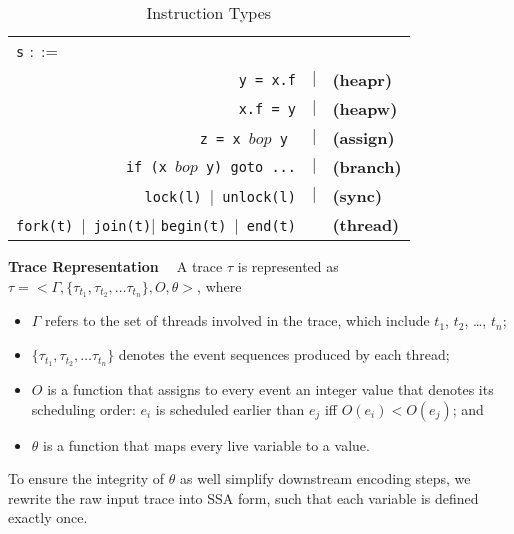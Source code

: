 \begin{table}
	\begin{center}
		\begin{tabular}{rcl}
			\multicolumn{1}{l}{{\tt s} $::=$} & & \\
			{\tt y = x.f} & $|$ & {\bf (heapr)} \\ 
			{\tt x.f = y}  & $|$ & {\bf (heapw)} \\ %
			{\tt z = x $bop$ y}\  & $|$ & {\bf (assign)} \\ %
			{\tt if (x $bop$  y) goto ...} & $|$ &  {\bf (branch)} \\
			{\tt lock(l)}\ $|$\ {\tt unlock(l)}  & $|$& {\bf (sync)} \\
			{\tt fork(t)}\ $|$\ {\tt join(t)}$|$ {\tt begin(t)}\ $|$\ {\tt end(t)} &  & {\bf (thread)}
		\end{tabular}
	\end{center}
	\caption{\label{Ta:syntax}Instruction Types}
\vspace{-0.15in}
\end{table}


{\bf Trace Representation \ } A trace $\tau$ is represented as $\tau=<\Gamma , \{\tau_{t_1}, \tau_{t_2}, \dots \tau_{t_n} \}, O, \theta>$, where
\begin{itemize}
\item  $\Gamma$ refers to the set of threads involved in the trace, which include $t_1$, $t_2$, \dots, $t_n$;
\item   $\{\tau_{t_1}, \tau_{t_2}, \dots \tau_{t_n} \}$ denotes the event sequences produced by each thread;
\item  $O$ is a function that assigns  to every event an integer value that denotes its scheduling order: $e_i$ is scheduled earlier than $e_j$ iff $O(e_i)<O(e_j)$; and
\item  $\theta$ is a function that maps every live variable to a value. 
\end{itemize}
To ensure the integrity of $\theta$ as well simplify downstream encoding 
steps,
we rewrite the raw input trace into SSA form, such that each variable is defined exactly once.




